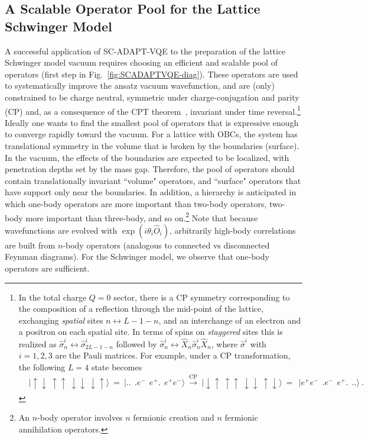 \documentclass[aps, pra, onecolumn, tightenlines, letterpaper, amsmath, amssymb, preprintnumbers, floatfix, longbibliography, nofootinbib]{revtex4-2}
\begin{document}
\subsection{A Scalable Operator Pool for the Lattice Schwinger Model}
\label{sec:CQAdaptVQESM}
\noindent
A successful application of SC-ADAPT-VQE to the preparation of the lattice Schwinger model vacuum requires choosing an efficient and scalable pool of operators (first step in Fig.~\ref{fig:SCADAPTVQE-diag}).
These operators are
used to systematically improve the ansatz vacuum wavefunction, 
and are (only) constrained to be
charge neutral, 
symmetric under charge-conjugation and parity (CP) and, as a consequence of the CPT theorem~\cite{Bell:1955djs,Schwinger:1951xk,Luders:1954zz}, invariant under time reversal.\footnote{In the total charge $Q=0$ sector, there is a CP symmetry corresponding to the composition of a reflection through the mid-point of the lattice, exchanging {\it spatial} sites $n \leftrightarrow L-1-n$, and an interchange of an electron and a positron on each spatial site. 
In terms of spins on {\it staggered} sites this is realized as $\hat{\sigma}^i_n \leftrightarrow \hat{\sigma}_{2L-1-n}^i$ followed by $\hat{\sigma}_n^i \leftrightarrow \hat{X}_n\hat{\sigma}_n^i\hat{X}_n$, where $\hat{\sigma}^i$ with $i=1,2,3$ are the Pauli matrices.
For example, under a CP transformation, the following $L=4$ state becomes
\begin{align}
&
|\uparrow\downarrow\ \uparrow\uparrow\ \downarrow\downarrow\ \downarrow\uparrow\rangle \ = \ |. .\ \ . e^-\ \ e^+ .\ \ e^+ e^-\rangle \ \xrightarrow[ ]{\text{CP}} 
\ |\downarrow\uparrow\ \uparrow\uparrow\ \downarrow\downarrow\ \uparrow\downarrow\rangle 
\ =\ 
\ |e^+ e^-\ \ . e^-\ \ e^+ .\ \ . .\rangle
\ .
\label{eq:CP}
\end{align}
%
}
Ideally one wants to find the smallest pool of operators 
that is expressive enough to converge rapidly toward the vacuum.
For a lattice with OBCs, 
the system has translational symmetry in the volume that is broken by the boundaries (surface).
In the vacuum, 
the effects of the boundaries are expected to be localized, 
with penetration depths set by the mass gap.
Therefore, 
the pool of operators should contain 
translationally invariant ``volume" operators, 
and ``surface" operators that have support only near the boundaries.
In addition, a hierarchy is anticipated in which one-body operators 
are more important 
than two-body operators, 
two-body more important than three-body, and so on.\footnote{An $n$-body operator involves $n$ fermionic creation and $n$ fermionic annihilation operators.}
Note that because wavefunctions are evolved with ${\exp}(i \theta_i \hat{O}_i)$, 
arbitrarily high-body correlations are built from $n$-body operators 
(analogous to connected vs disconnected Feynman diagrams).
For the Schwinger model, we observe that one-body operators are sufficient. 
\end{document}
